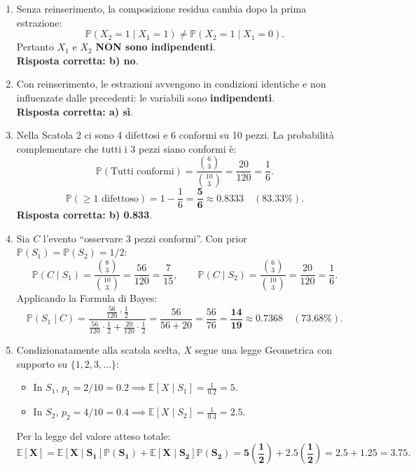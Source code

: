 \documentclass[11pt,a4paper]{article}
\newcommand{\EE}{\mathbb{E}}
\newcommand{\Prob}{\mathbb{P}}
\begin{document}
\begin{soluzionebox}
\begin{enumerate}[label=(\alph*)]
    \item Senza reinserimento, la composizione residua cambia dopo la prima estrazione:
    \[
    \Prob(X_2 = 1 \mid X_1 = 1) \neq \Prob(X_2 = 1 \mid X_1 = 0).
    \]
    Pertanto $X_1$ e $X_2$ \textbf{NON sono indipendenti}.\\
    \textbf{Risposta corretta: b) no}.

    \item Con reinserimento, le estrazioni avvengono in condizioni identiche e non influenzate dalle precedenti: le variabili sono \textbf{indipendenti}.\\
    \textbf{Risposta corretta: a) sì}.

    \item Nella Scatola 2 ci sono 4 difettosi e 6 conformi su 10 pezzi.
    La probabilità complementare che tutti i 3 pezzi siano conformi è:
    \[
    \Prob(\text{Tutti conformi}) = \frac{\binom{6}{3}}{\binom{10}{3}} = \frac{20}{120} = \frac{1}{6}.
    \]
    \[
    \Prob(\ge 1\text{ difettoso}) = 1 - \frac{1}{6} = \mathbf{\frac{5}{6} \approx 0.8333} \quad (\mathbf{83.33\%}).
    \]
    \textbf{Risposta corretta: b) 0.833}.

    \item Sia $C$ l'evento ``osservare 3 pezzi conformi''. Con prior $\Prob(S_1) = \Prob(S_2) = 1/2$:
    \[
    \Prob(C \mid S_1) = \frac{\binom{8}{3}}{\binom{10}{3}} = \frac{56}{120} = \frac{7}{15}, \qquad \Prob(C \mid S_2) = \frac{\binom{6}{3}}{\binom{10}{3}} = \frac{20}{120} = \frac{1}{6}.
    \]
    Applicando la Formula di Bayes:
    \[
    \Prob(S_1 \mid C) = \frac{\frac{56}{120} \cdot \frac{1}{2}}{\frac{56}{120} \cdot \frac{1}{2} + \frac{20}{120} \cdot \frac{1}{2}} = \frac{56}{56 + 20} = \frac{56}{76} = \mathbf{\frac{14}{19} \approx 0.7368} \quad (\mathbf{73.68\%}).
    \]

    \item Condizionatamente alla scatola scelta, $X$ segue una legge Geometrica con supporto su $\{1, 2, 3, \dots\}$:
    \begin{itemize}
        \item In $S_1$, $p_1 = 2/10 = 0.2 \implies \EE[X \mid S_1] = \frac{1}{0.2} = 5$.
        \item In $S_2$, $p_2 = 4/10 = 0.4 \implies \EE[X \mid S_2] = \frac{1}{0.4} = 2.5$.
    \end{itemize}
    Per la legge del valore atteso totale:
    \[
    \mathbf{\EE[X] = \EE[X \mid S_1]\Prob(S_1) + \EE[X \mid S_2]\Prob(S_2) = 5\left(\frac{1}{2}\right) + 2.5\left(\frac{1}{2}\right) = 2.5 + 1.25 = 3.75}.
    \]
\end{enumerate}
\end{soluzionebox}
\end{document}
